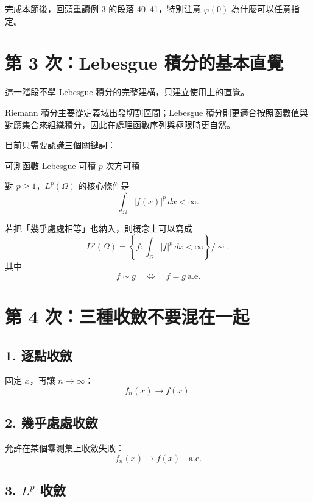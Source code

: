 \documentclass[11pt,a4paper,twoside]{article}
\newif\ifstudynotes
\newcommand{\ImportantNote}[2]{%
  \ifstudynotes
    \begin{importantNote}[title={#1}]
      #2
    \end{importantNote}
  \fi
}
\begin{document}
\ImportantNote{$L^p$ 空間真正的元素}{
    在 $L^p$ 空間中，只在零測集上不同的函數會被視為同一個元素。

    因此更精確地說，$L^p$ 的元素不是單一函數，而是「幾乎處處相等」所形成的等價類。
}

完成本節後，回頭重讀例 3 的段落 40--41，特別注意
$\overline{\varphi}(0)$ 為什麼可以任意指定。

\section*{第 3 次：Lebesgue 積分的基本直覺}

這一階段不學 Lebesgue 積分的完整建構，只建立使用上的直覺。

Riemann 積分主要從定義域出發切割區間；Lebesgue 積分則更適合按照函數值與對應集合來組織積分，因此在處理函數序列與極限時更自然。

目前只需要認識三個關鍵詞：

\begin{center}
    可測函數 \qquad Lebesgue 可積 \qquad $p$ 次方可積
\end{center}

對 $p\ge1$，$L^p(\Omega)$ 的核心條件是
\[
    \int_{\Omega}|f(x)|^p\,dx<\infty.
\]

若把「幾乎處處相等」也納入，則概念上可以寫成
\[
    L^p(\Omega)
    =
    \left\{
    f:\int_{\Omega}|f|^p\,dx<\infty
    \right\}\big/\!\sim,
\]
其中
\[
    f\sim g
    \quad\Longleftrightarrow\quad
    f=g\ \text{a.e.}
\]

\section*{第 4 次：三種收斂不要混在一起}

\subsection*{1. 逐點收斂}

固定 $x$，再讓 $n\to\infty$：
\[
    f_n(x)\to f(x).
\]

\subsection*{2. 幾乎處處收斂}

允許在某個零測集上收斂失敗：
\[
    f_n(x)\to f(x)\quad \text{a.e.}
\]

\subsection*{3. $L^p$ 收斂}
\end{document}

